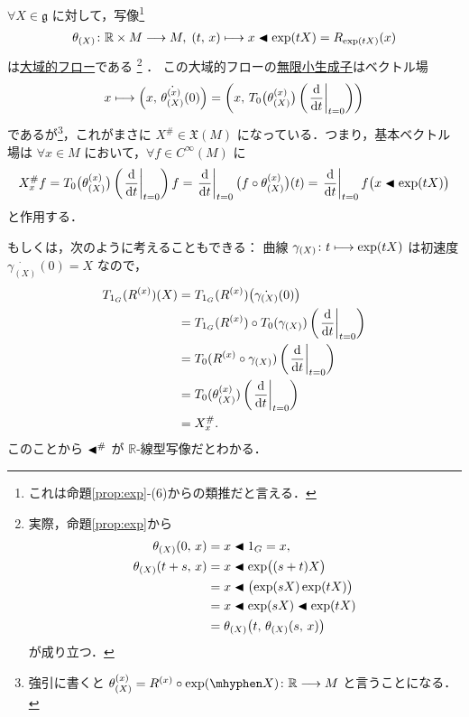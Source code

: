 \documentclass[TQFT_main]{subfiles}
\begin{document}
$\forall X \in \mathfrak{g}$ に対して，\cinfty 写像\footnote{これは命題\ref{prop:exp}-(6)からの類推だと言える．}
\begin{align}
    \theta_{(X)} \colon \mathbb{R} \times M \longrightarrow M,\; (t,\, x) \longmapsto x \blacktriangleleft \exp(tX) = R_{\exp(tX)} (x)
\end{align}
は\hyperref[def:flow-global]{大域的フロー}である
\footnote{
    実際，命題\ref{prop:exp}から
    \begin{align}
        \theta_{(X)}(0,\, x) &= x \blacktriangleleft 1_G = x, \\
        \theta_{(X)}(t+s,\, x) &= x \blacktriangleleft \exp \bigl( (s+t) X \bigr) \\
        &= x \blacktriangleleft \bigl(\exp(sX)\exp(tX)\bigr) \\
        &= x \blacktriangleleft \exp(sX) \blacktriangleleft \exp(tX) \\
        &= \theta_{(X)} \bigl(t ,\, \theta_{(X)}(s,\, x)\bigr)
    \end{align}
    が成り立つ．
}
．
この大域的フローの\hyperref[def:thm:fundamental-flow]{無限小生成子}はベクトル場
\begin{align}
    x \lmto \Bigl( x,\, \dot{\theta_{(X)}^{(x)}} (0) \Bigr) = \left( x,\, T_0 \bigl( \theta_{(X)}^{(x)} \bigr) \left( \eval{\dv{}{t}}_{t=0} \right)   \right) 
\end{align}
であるが\footnote{強引に書くと $\theta^{(x)}_{(X)} = R^{(x)} \circ \exp (\mhyphen X) \colon \mathbb{R} \lto M$ と言うことになる．}，これがまさに $X^\# \in \mathfrak{X}(M)$ になっている．つまり，基本ベクトル場は $\forall x \in M$ において，$\forall f \in C^\infty (M)$ に
\begin{align}
    X^\#_x f = T_0 \bigl( \theta_{(X)}^{(x)} \bigr) \left( \eval{\dv{}{t}}_{t=0} \right)f = \eval{\dv{}{t}}_{t=0} \bigl( f \circ \theta_{(X)}^{(x)}  \bigr) (t) = \eval{\dv{}{t}}_{t=0} f \bigl(x \btl \exp(tX)\bigr)
\end{align}
と作用する．

もしくは，次のように考えることもできる：
曲線 $\gamma_{(X)} \colon t  \longmapsto \exp(tX)$ は初速度 $\dot{\gamma_{(X)}}(0) = X$ なので，
\begin{align}
    T_{1_G}(R^{(x)}) (X) 
    &= T_{1_G} (R^{(x)}) \bigl( \dot{\gamma_{(X)}}(0) \bigr) \\
    &= T_{1_G} (R^{(x)}) \circ T_0 (\gamma_{(X)}) \left( \eval{\dv{}{t}}_{t=0} \right) \\
    &= T_0 (R^{(x)} \circ \gamma_{(X)}) \left( \eval{\dv{}{t}}_{t=0} \right) \\
    &= T_0 (\theta_{(X)}^{(x)})\left( \eval{\dv{}{t}}_{t=0} \right) \\
    &= X^\#_x.
\end{align}
このことから $\blacktriangleleft^\#$ が $\mathbb{R}$-線型写像だとわかる．
\end{document}
